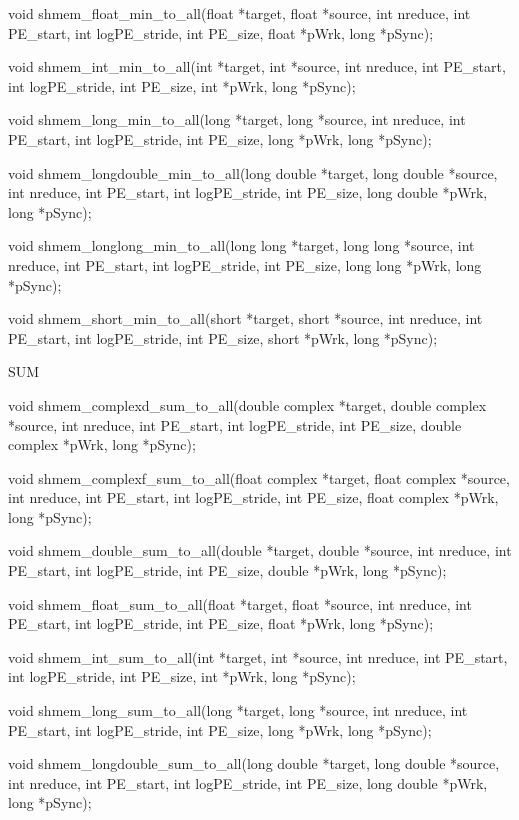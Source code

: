 	  void	shmem_float_min_to_all(float  *target,	float	*source,   int
	  nreduce,  int	 PE_start, int logPE_stride, int PE_size, float *pWrk,
	  long *pSync);

	  void shmem_int_min_to_all(int *target, int *source, int nreduce, int
	  PE_start, int logPE_stride, int PE_size, int *pWrk, long *pSync);

	  void	shmem_long_min_to_all(long *target, long *source, int nreduce,
	  int PE_start,	 int  logPE_stride,  int  PE_size,  long  *pWrk,  long
	  *pSync);

	  void	shmem_longdouble_min_to_all(long  double  *target, long double
	  *source, int nreduce, int PE_start, int logPE_stride,	 int  PE_size,
	  long double *pWrk, long *pSync);

	  void shmem_longlong_min_to_all(long long *target, long long *source,
	  int nreduce, int PE_start, int logPE_stride, int PE_size, long  long
	  *pWrk, long *pSync);

	  void	 shmem_short_min_to_all(short	*target,  short	 *source,  int
	  nreduce, int PE_start, int logPE_stride, int PE_size,	 short	*pWrk,
	  long *pSync);
	  
	  SUM
	  
	  void	shmem_complexd_sum_to_all(double   complex   *target,	double
	  complex  *source,  int  nreduce, int PE_start, int logPE_stride, int
	  PE_size, double complex *pWrk, long *pSync);

	  void shmem_complexf_sum_to_all(float complex *target, float  complex
	  *source,  int	 nreduce, int PE_start, int logPE_stride, int PE_size,
	  float complex *pWrk, long *pSync);

	  void shmem_double_sum_to_all(double  *target,	 double	 *source,  int
	  nreduce,  int PE_start, int logPE_stride, int PE_size, double *pWrk,
	  long *pSync);

	  void	shmem_float_sum_to_all(float  *target,	float	*source,   int
	  nreduce,  int	 PE_start, int logPE_stride, int PE_size, float *pWrk,
	  long *pSync);

	  void shmem_int_sum_to_all(int *target, int *source, int nreduce, int
	  PE_start, int logPE_stride, int PE_size, int *pWrk, long *pSync);

	  void	shmem_long_sum_to_all(long *target, long *source, int nreduce,
	  int PE_start,	 int  logPE_stride,  int  PE_size,  long  *pWrk,  long
	  *pSync);

	  void	shmem_longdouble_sum_to_all(long  double  *target, long double
	  *source, int nreduce, int PE_start, int logPE_stride,	 int  PE_size,
	  long double *pWrk, long *pSync);

